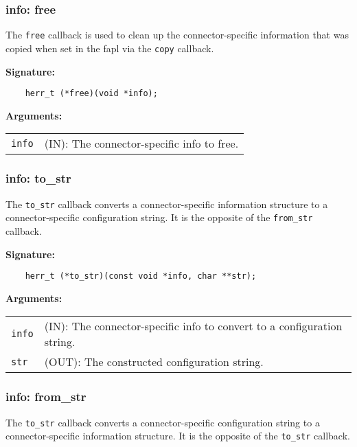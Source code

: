 \subsubsection{info: free}
The \texttt{free} callback is used to clean up the connector-specific information that was copied when set in the fapl via the \texttt{copy} callback.

\begin{mdframed}[style=bgbox]
\textbf{Signature:}
\begin{lstlisting}
    herr_t (*free)(void *info);
\end{lstlisting}
\textbf{Arguments:}\\
\begin{tabular}{l p{13.5cm}}
  \texttt{info} & (IN): The connector-specific info to free.\\
\end{tabular}
\end{mdframed}

\subsubsection{info: to\_str}
The \texttt{to\_str} callback converts a connector-specific information structure to a connector-specific configuration string. It is the opposite of the \texttt{from\_str} callback.

\begin{mdframed}[style=bgbox]
\textbf{Signature:}
\begin{lstlisting}
    herr_t (*to_str)(const void *info, char **str);
\end{lstlisting}
\textbf{Arguments:}\\
\begin{tabular}{l p{13.5cm}}
  \texttt{info} & (IN): The connector-specific info to convert to a configuration string.\\
  \texttt{str} & (OUT): The constructed configuration string.\\
\end{tabular}
\end{mdframed}

\subsubsection{info: from\_str}
The \texttt{to\_str} callback converts a connector-specific configuration string to a connector-specific information structure. It is the opposite of the \texttt{to\_str} callback.

